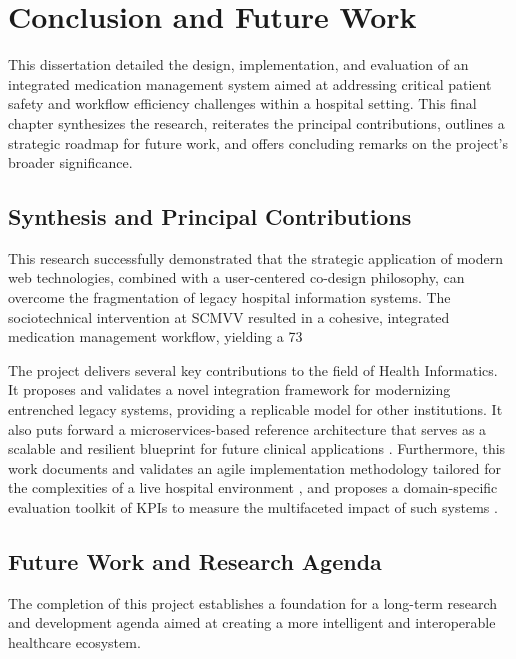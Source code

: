 \chapter{Conclusion and Future Work}

This dissertation detailed the design, implementation, and evaluation of an integrated medication management system aimed at addressing critical patient safety and workflow efficiency challenges within a hospital setting. This final chapter synthesizes the research, reiterates the principal contributions, outlines a strategic roadmap for future work, and offers concluding remarks on the project's broader significance.

\section{Synthesis and Principal Contributions}

This research successfully demonstrated that the strategic application of modern web technologies, combined with a user-centered co-design philosophy, can overcome the fragmentation of legacy hospital information systems. The sociotechnical intervention at SCMVV resulted in a cohesive, integrated medication management workflow, yielding a 73%

The project delivers several key contributions to the field of Health Informatics. It proposes and validates a novel integration framework for modernizing entrenched legacy systems, providing a replicable model for other institutions. It also puts forward a microservices-based reference architecture that serves as a scalable and resilient blueprint for future clinical applications \cite{newman2021}. Furthermore, this work documents and validates an agile implementation methodology tailored for the complexities of a live hospital environment \cite{may2013}, and proposes a domain-specific evaluation toolkit of KPIs to measure the multifaceted impact of such systems \cite{donabedian1988}.

\section{Future Work and Research Agenda}

The completion of this project establishes a foundation for a long-term research and development agenda aimed at creating a more intelligent and interoperable healthcare ecosystem.

